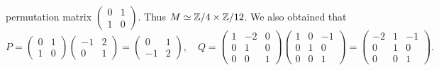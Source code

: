 \begin{example}
permutation matrix 
$\begin{pmatrix}0&1\\1&0\end{pmatrix}$. 
Thus  $M\simeq\mathbb{Z}/4\times\mathbb{Z}/{12}$. We also obtained that
\[
P=
\begin{pmatrix}
    0&1\\
    1&0
    \end{pmatrix}
\begin{pmatrix}
    -1&2\\
    0&1
    \end{pmatrix}
    =
    \begin{pmatrix}
    0&1\\
    -1&2
    \end{pmatrix}
    ,\quad
    Q=\begin{pmatrix}
        1&-2&0\\
        0&1&0\\
        0&0&1
    \end{pmatrix}
    \begin{pmatrix}
        1&0&-1\\
        0&1&0\\
        0&0&1
    \end{pmatrix}
    =\begin{pmatrix}
        -2&1&-1\\
        0&1&0\\
        0&0&1
    \end{pmatrix}.
    \]
\end{example}

